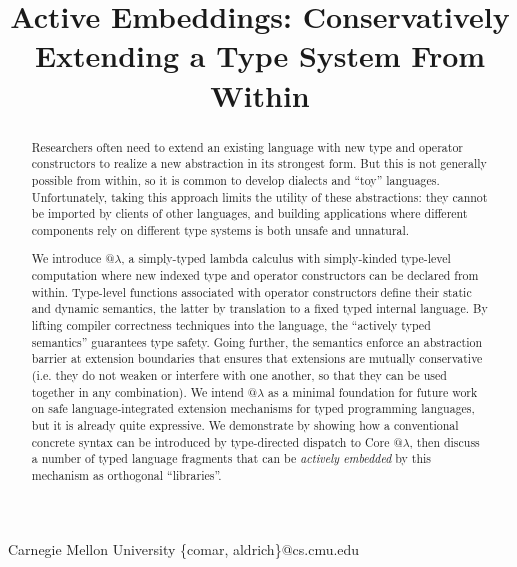 \documentclass[9pt,preprint]{sigplanconf}
\begin{document}
\conferenceinfo{-}{-} 
\copyrightyear{-} 
\copyrightdata{[to be supplied]} 


\title{Active Embeddings: Conservatively Extending a Type System From Within}

           {Carnegie Mellon University}
            {\{comar, aldrich\}@cs.cmu.edu}   

\maketitle
\begin{abstract}
Researchers often need to extend an existing language with new type and operator constructors to realize a new abstraction in its strongest form. 
But this is not generally possible from within, so it is common to develop dialects and ``toy'' languages.
Unfortunately, taking this approach limits the utility of these abstractions: they cannot be imported by clients of other languages, and building applications where different components rely on different type systems is both unsafe and unnatural. 

We introduce @$\lambda$, a simply-typed lambda calculus with simply-kinded type-level computation where new indexed type and operator constructors can be declared  from within. %
Type-level functions associated with operator constructors define their static and dynamic semantics, the latter by translation to a fixed typed internal language. By lifting compiler correctness techniques into the language, the ``actively typed semantics'' guarantees type safety. Going further, the semantics enforce an abstraction barrier at extension boundaries that ensures that extensions are mutually conservative (i.e. they do not weaken or interfere with one another, so that they can  be used together in any combination). 
We intend @$\lambda$ as a minimal foundation for future work on safe language-integrated extension mechanisms for typed programming languages, but it is already quite expressive. We demonstrate by showing how a conventional concrete syntax can be introduced by type-directed dispatch to Core @$\lambda$, then discuss a number of typed language fragments that can be \emph{actively embedded} by this mechanism as orthogonal ``libraries''. %
\end{abstract}
\end{document}
